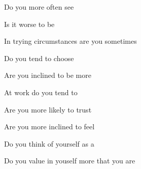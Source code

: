 \documentclass[english,pdf,pagemark,stamp,globalid=\candidateID,oneside,PrintQuestionnaireId=False]{sdaps}
\begin{document}
\begin{questionnaire}
\begin{multicols}{2}
\begin{choicequestion}[2]{Do you more often see}
\end{choicequestion}

\begin{choicequestion}[2]{Is it worse to be}
\end{choicequestion}

\begin{choicequestion}[2]{In trying circumstances are you sometimes}
\end{choicequestion}

\begin{choicequestion}[2]{Do you tend to choose}
\end{choicequestion}

\begin{choicequestion}[2]{Are you inclined to be more}
\end{choicequestion}

\begin{choicequestion}[2]{At work do you tend to}
\end{choicequestion}

\begin{choicequestion}[2]{Are you more likely to trust}
\end{choicequestion}

\begin{choicequestion}[2]{Are you more inclined to feel}
\end{choicequestion}

\begin{choicequestion}[2]{Do you think of yourself as a}
\end{choicequestion}

\begin{choicequestion}[2]{Do you value in youself more that you are}
\end{choicequestion}


\end{multicols}
\end{questionnaire}
\end{document}

